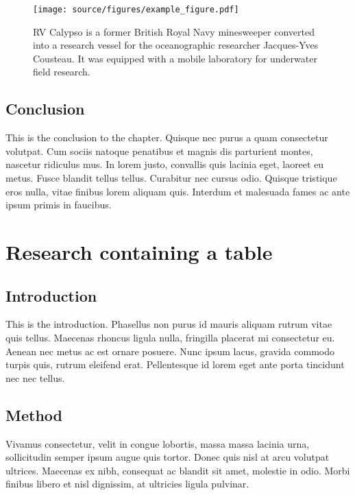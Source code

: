 \documentclass[12pt,turkish,a4paperpaper,]{report}
\begin{document}
\begin{figure}
\centering
\texttt{[image: source/figures/example\_figure.pdf]}
\caption{RV Calypso is a former British Royal Navy minesweeper converted
into a research vessel for the oceanographic researcher Jacques-Yves
Cousteau. It was equipped with a mobile laboratory for underwater field
research. \label{ref_a_figure}}
\end{figure}

\hypertarget{conclusion-2}{%
\section{Conclusion}\label{conclusion-2}}

This is the conclusion to the chapter. Quisque nec purus a quam
consectetur volutpat. Cum sociis natoque penatibus et magnis dis
parturient montes, nascetur ridiculus mus. In lorem justo, convallis
quis lacinia eget, laoreet eu metus. Fusce blandit tellus tellus.
Curabitur nec cursus odio. Quisque tristique eros nulla, vitae finibus
lorem aliquam quis. Interdum et malesuada fames ac ante ipsum primis in
faucibus.

\hypertarget{research-containing-a-table}{%
\chapter{Research containing a
table}\label{research-containing-a-table}}

\thispagestyle{empty}

\hypertarget{introduction-3}{%
\section{Introduction}\label{introduction-3}}

This is the introduction. Phasellus non purus id mauris aliquam rutrum
vitae quis tellus. Maecenas rhoncus ligula nulla, fringilla placerat mi
consectetur eu. Aenean nec metus ac est ornare posuere. Nunc ipsum
lacus, gravida commodo turpis quis, rutrum eleifend erat. Pellentesque
id lorem eget ante porta tincidunt nec nec tellus.

\hypertarget{method-2}{%
\section{Method}\label{method-2}}

Vivamus consectetur, velit in congue lobortis, massa massa lacinia urna,
sollicitudin semper ipsum augue quis tortor. Donec quis nisl at arcu
volutpat ultrices. Maecenas ex nibh, consequat ac blandit sit amet,
molestie in odio. Morbi finibus libero et nisl dignissim, at ultricies
ligula pulvinar.
\end{document}
